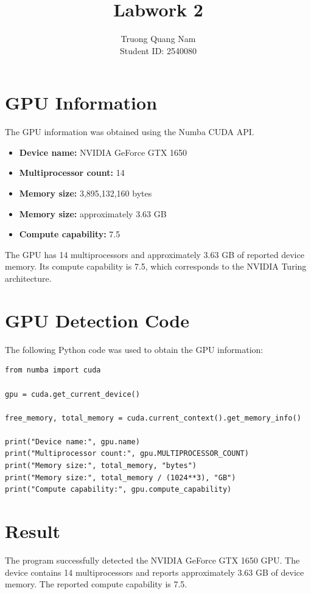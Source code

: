 \documentclass[12pt,a4paper]{article}
\title{\textbf{Labwork 2}}
\author{Truong Quang Nam\\Student ID: 2540080}
\date{}
\begin{document}
\maketitle

\section{GPU Information}

The GPU information was obtained using the Numba CUDA API.

\begin{itemize}
    \item \textbf{Device name:} NVIDIA GeForce GTX 1650
    \item \textbf{Multiprocessor count:} 14
    \item \textbf{Memory size:} 3,895,132,160 bytes
    \item \textbf{Memory size:} approximately 3.63 GB
    \item \textbf{Compute capability:} 7.5
\end{itemize}

The GPU has 14 multiprocessors and approximately 3.63 GB of reported
device memory. Its compute capability is 7.5, which corresponds to the
NVIDIA Turing architecture.

\section{GPU Detection Code}

The following Python code was used to obtain the GPU information:

\begin{verbatim}
from numba import cuda

gpu = cuda.get_current_device()

free_memory, total_memory = cuda.current_context().get_memory_info()

print("Device name:", gpu.name)
print("Multiprocessor count:", gpu.MULTIPROCESSOR_COUNT)
print("Memory size:", total_memory, "bytes")
print("Memory size:", total_memory / (1024**3), "GB")
print("Compute capability:", gpu.compute_capability)
\end{verbatim}

\section{Result}

The program successfully detected the NVIDIA GeForce GTX 1650 GPU.
The device contains 14 multiprocessors and reports approximately
3.63 GB of device memory. The reported compute capability is 7.5.
\end{document}
